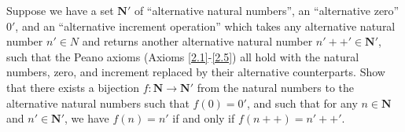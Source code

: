\begin{exercise}\label{ex 3.5.13}
    Suppose we have a set \(\mathbf{N}'\) of ``alternative natural numbers'', an ``alternative zero'' \(0'\), and an ``alternative increment operation'' which takes any alternative natural number \(n' \in N\) and returns another alternative natural number \(n'++' \in \mathbf{N}'\), such that the Peano axioms (Axioms \ref{2.1}-\ref{2.5}) all hold with the natural numbers, zero, and increment replaced by their alternative counterparts.
    Show that there exists a bijection \(f : \mathbf{N} \to \mathbf{N}'\) from the natural numbers to the alternative natural numbers such that \(f(0) = 0'\), and such that for any \(n \in \mathbf{N}\) and \(n' \in \mathbf{N}'\), we have \(f(n) = n'\) if and only if \(f(n++) = n'++'\).
\end{exercise}

